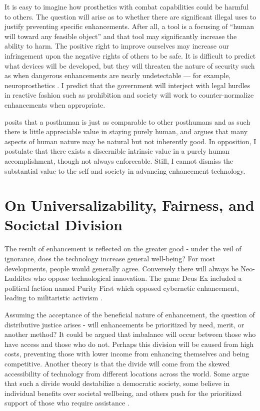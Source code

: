 \documentclass[10pt, oneside, letterpaper]{article}
\begin{document}
\begin{multicols}{2}
	It is easy to imagine how prosthetics with combat capabilities could be harmful to others. The question will arise as to whether there are significant illegal uses to justify preventing specific enhancements. After all, a tool is a focusing of ``human will toward any feasible object'' \cite{Galvan2011} and that tool may significantly increase the ability to harm. The positive right to improve ourselves may increase our infringement upon the negative rights of others to be safe. It is difficult to predict what devices will be developed, but they will threaten the nature of security such as when dangerous enhancements are nearly undetectable --- for example, neuroprosthetics \cite{Coates2008}. I predict that the government will interject with legal hurdles in reactive fashion such as prohibition and society will work to counter-normalize enhancements when appropriate.
	
	 posits that a posthuman is just as comparable to other posthumans and as such there is little appreciable value in staying purely human, and  argues that many aspects of human nature may be natural but not inherently good. In opposition, I postulate that there exists a discernible intrinsic value in a purely human accomplishment, though not always enforceable. Still, I cannot dismiss the substantial value to the self and society in advancing enhancement technology.
	
	\section{On Universalizability, Fairness, and Societal Division}
	
	The result of enhancement is reflected on the greater good - under the veil of ignorance, does the technology increase general well-being? For most developments, people would generally agree. Conversely there will always be Neo-Luddites who oppose technological innovation. The game Deus Ex included a political faction named Purity First which opposed cybernetic enhancement, leading to militaristic activism \cite{Eidos2011}.
	
	Assuming the acceptance of the beneficial nature of enhancement, the question of distributive justice arises - will enhancements be prioritized by need, merit, or another method? It could be argued that imbalance will occur between those who have access and those who do not. Perhaps this division will be caused from high costs, preventing those with lower income from enhancing themselves and being competitive. Another theory is that the divide will come from the skewed accessibility of technology from different locations across the world. Some argue that such a divide would destabilize a democratic society, some believe in individual benefits over societal wellbeing, and others push for the prioritized support of those who require assistance \cite[p.~236]{Guibilini2015}.
	

\end{multicols}
\end{document}
